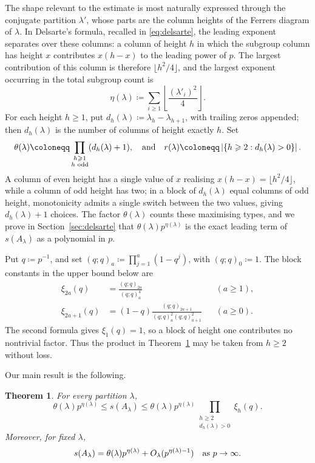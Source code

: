 \documentclass[a4paper,11pt,reqno]{amsart}
\theoremstyle{plain}
\newtheorem{theoremA}{Theorem}
\theoremstyle{remark}
\numberwithin{equation}{section}
\newcommand{\card}[1]{\left\lvert #1\right\rvert}
\renewcommand{\leq}{\leqslant}
\renewcommand{\geq}{\geqslant}
\begin{document}
The shape relevant to the estimate is most naturally expressed through the
conjugate partition $\lambda'$, whose parts are the column heights of the
Ferrers diagram of $\lambda$. 
In Delsarte's formula, recalled in \eqref{eq:delsarte}, 
the leading exponent separates over these columns: 
a column of height $h$ in which the subgroup column has height $x$ 
contributes $x(h-x)$ to the leading power of $p$. 
The largest contribution of this column is therefore $\lfloor h^2/4\rfloor$, 
and the largest exponent occurring in the total subgroup count is
\[
        \eta(\lambda) \coloneqq
        \sum_{i\geq 1}\left\lfloor\frac{(\lambda'_i)^2}{4}\right\rfloor.
\]
For each height $h\geq 1$, put $d_h(\lambda)\coloneqq\lambda_h-\lambda_{h+1}$, with
trailing zeros appended; then $d_h(\lambda)$ is the number of columns of
height exactly $h$. Set
\[
        \theta(\lambda) \coloneqq
        \prod_{\substack{h\geq 1\\ h\textnormal{ odd}}}(d_h(\lambda)+1),
        \quad \text{and} \quad
        r(\lambda) \coloneqq \card{\{h\geq 2:d_h(\lambda)>0\}}.
\]
A column of even height has a single value of $x$ realising
$x(h-x)=\lfloor h^2/4\rfloor$, while a column of odd height has two; in a
block of $d_h(\lambda)$ equal columns of odd height, monotonicity admits a
single switch between the two values, giving $d_h(\lambda)+1$ choices. 
The factor $\theta(\lambda)$ counts these maximising types, and we prove in
Section~\ref{sec:delsarte} that $\theta(\lambda)p^{\eta(\lambda)}$ is the
exact leading term of $s(A_\lambda)$ as a polynomial in $p$.

Put $q\coloneqq p^{-1}$, and set $(q;q)_a\coloneqq\prod_{j=1}^a(1-q^j)$, with
$(q;q)_0\coloneqq 1$. The block constants in the upper bound below are
\begin{equation}\label{eq:block-constants}
\begin{aligned}
        \xi_{2a}(q)
        &=
        \frac{(q;q)_{2a}}{(q;q)_a^4}
        &&(a\geq 1), \\
        \xi_{2a+1}(q)
        &=
        (1-q)\frac{(q;q)_{2a+1}}{(q;q)_a^2(q;q)_{a+1}^2}
        &&(a\geq 0).
\end{aligned}
\end{equation}
The second formula gives $\xi_1(q)=1$, so a block of height one contributes no
nontrivial factor. Thus the product in Theorem~\ref{thm:main} may be taken
from $h\geq 2$ without loss.

Our main result is the following.

\begin{theoremA}\label{thm:main}
For every partition $\lambda$,
\[
        \theta(\lambda)p^{\eta(\lambda)}
        \leq
        s(A_\lambda)
        \leq
        \theta(\lambda)p^{\eta(\lambda)}
        \prod_{\substack{h\geq 2\\ d_h(\lambda)>0}}\xi_h(q).
\]
Moreover, for fixed $\lambda$,
\[
        s(A_\lambda)=
        \theta(\lambda)p^{\eta(\lambda)}
        +O_\lambda(p^{\eta(\lambda)-1})
        \quad \textnormal{as } p\to\infty.
\]
\end{theoremA}
\end{document}
